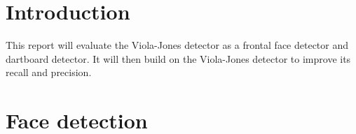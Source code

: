 \documentclass{article}
\begin{document}
\setlength{\columnsep}{0.8cm}
\begin{multicols}{2}

\section{Introduction}

This report will evaluate the Viola-Jones detector as a frontal face detector and dartboard detector. It will then build on the Viola-Jones detector to improve its recall and precision.

\section{Face detection}

\setlength{\columnsep}{0.1cm}
\end{multicols}
\end{document}
